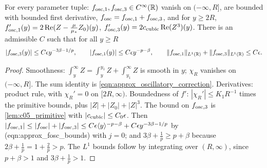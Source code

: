 \begin{lemma}
  \label{lem:c05_osc_split_bounds}
  For every parameter tuple: $f_{\textup{osc},1},f_{\textup{osc},3}\in C^\infty(\mathbb{R})$ vanish on $(-\infty,R]$, are bounded with bounded first
  derivative, $f_{\textup{osc}}=f_{\textup{osc},1}+f_{\textup{osc},3}$, and for $y\ge2R$,
  $f_{\textup{osc},1}'(y)=2\operatorname{Re}(Z-\frac{\mu}{\mu_*}Z_0)(y)$, $f_{\textup{osc},3}'(y)=2c_{\textup{cubic}}\operatorname{Re}(Z^3)(y)$.
  There is an admissible $C$ such that for all $y\ge R$
  \[
    |f_{\textup{osc},3}(y)|\le C\epsilon y^{-3\beta-1/p},\qquad |f_{\textup{osc},1}(y)|\le C\epsilon y^{-p-\beta},\qquad
    \|f_{\textup{osc},1}\|_{L^1(\mathbb{R})}+\|f_{\textup{osc},3}\|_{L^1(\mathbb{R})}\le C\epsilon .
  \]
\end{lemma}
\begin{proof}
  Smoothness: $\int_y^\infty Z=\int_y^{y_1}Z+\int_{y_1}^\infty Z$ is smooth in $y$; $\chi_R$ vanishes on $(-\infty,R]$.
  The sum identity is \eqref{eqn:approx_oscillatory_correction}. Derivatives: product rule, with $\chi_R'=0$ on $[2R,\infty)$.
  Boundedness of $f'$: $|\chi_R'|\le K_1R^{-1}$ times the primitive bounds, plus $|Z|+|Z_0|+|Z|^3$.
  The bound on $f_{\textup{osc},3}$ is \cref{lem:c05_primitive} with $|c_{\textup{cubic}}|\le C_0\epsilon$.
  Then $|f_{\textup{osc},1}|\le|f_{\textup{osc}}|+|f_{\textup{osc},3}|\le C\epsilon\langle y \rangle^{-p-\beta}+C\epsilon y^{-3\beta-1/p}$ by
  (eqn:approx\_fosc\_bounds) with $j=0$; and $3\beta+\frac1p\ge p+\beta$ because $2\beta+\frac1p=1+\frac2p>p$.
  The $L^1$ bounds follow by integrating over $(R,\infty)$, since $p+\beta>1$ and $3\beta+\frac1p>1$.
\end{proof}

